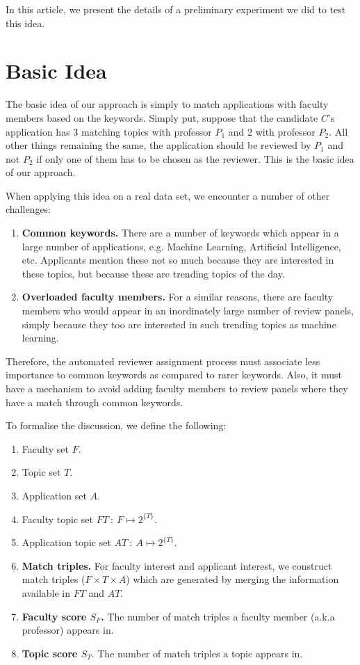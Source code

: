 \documentclass[12pt,a4paper]{article}
\begin{document}
In this article, we present the details of a preliminary experiment we did to test this idea.
 
\section{Basic Idea}
The basic idea of our approach is simply to match applications with faculty members based on the keywords. Simply put, suppose that the candidate $C$'s application has 3 matching topics with professor $P_1$ and 2 with professor $P_2$. All other things remaining the same, the application should be reviewed by $P_1$ and not $P_2$ if only one of them has to be chosen as the reviewer. This is the basic idea of our approach.

When applying this idea on a real data set, we encounter a number of other challenges:
\begin{enumerate}
\item \textbf{Common keywords.} There are a number of keywords which appear in a large number of applications, e.g. Machine Learning, Artificial Intelligence, etc. Applicants mention these not so much because they are interested in these topics, but because these are trending topics of the day.
\item \textbf{Overloaded faculty members.} For a similar reasons, there are faculty members who would appear in an inordinately large number of review panels, simply because they too are interested in such trending topics as machine learning.
\end{enumerate}

Therefore, the automated reviewer assignment process must associate less importance to common keywords as compared to rarer keywords. Also, it must have a mechanism to avoid adding faculty members to review panels where they have a match through common keywords.

To formalise the discussion, we define the following:
\begin{enumerate}
\item Faculty set $F$.
\item Topic set $T$.
\item Application set $A$.
\item Faculty topic set $FT\ :\ F \mapsto 2^{\{T\}}$.
\item Application topic set $AT\ :\ A \mapsto 2^{\{T\}}$.
\item \textbf{Match triples.} For faculty interest and applicant interest, we construct match triples ($F \times T \times A$) which are generated by merging the information available in $FT$ and $AT$.   
\item \textbf{Faculty score $S_F$.} The number of match triples a faculty member (a.k.a professor) appears in.
\item \textbf{Topic score $S_T$}. The number of match triples a topic appears in.
\end{enumerate}
\end{document}
